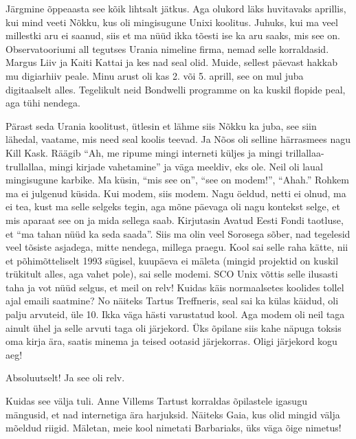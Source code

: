 Järgmine õppeaasta see kõik lihtsalt jätkus. Aga olukord läks huvitavaks aprillis, kui mind veeti Nõkku, kus oli mingisugune Unixi koolitus. Juhuks, kui ma veel millestki aru ei saanud, siis et ma nüüd ikka tõesti ise ka aru saaks, mis see on. Observatooriumi all tegutses Urania nimeline firma, nemad selle korraldasid. Margus Liiv ja  Kaiti Kattai ja kes nad seal olid. Muide, sellest päevast hakkab mu digiarhiiv peale.  Minu  arust oli kas 2. või 5. aprill, see on mul juba digitaalselt alles. Tegelikult neid Bondwelli programme on ka kuskil flopide peal, aga tühi nendega. 

Pärast seda Urania  koolitust,  ütlesin et lähme siis Nõkku ka juba, see siin lähedal, vaatame, mis need seal koolis teevad. Ja Nõos oli selline härrasmees nagu Kill Kask. Räägib \enquote{Ah, me ripume mingi interneti küljes ja mingi trillallaa-trullallaa, mingi kirjade vahetamine} ja väga meeldiv, eks ole. Neil oli laual mingisugune karbike. Ma küsin, \enquote{mis see on}, \enquote{see on modem!}, \enquote{Ahah.} Rohkem ma ei julgenud küsida. Kui modem, siis modem. Nagu öeldud, netti ei olnud, ma ei tea, kust ma selle selgeks tegin, aga mõne päevaga oli nagu kontekst selge, et mis aparaat see on ja mida sellega saab. Kirjutasin Avatud Eesti Fondi taotluse, et \enquote{ma tahan nüüd ka seda saada}. Siis ma olin veel Sorosega sõber, nad tegelesid veel tõsiste asjadega, mitte nendega, millega praegu. Kool sai selle raha kätte, nii et põhimõtteliselt 1993 sügisel, kuupäeva ei mäleta (mingid projektid on kuskil trükitult alles, aga vahet pole), sai selle modemi. SCO Unix võttis selle ilusasti taha ja vot nüüd selgus, et meil on relv! Kuidas käis normaalsetes koolides tollel ajal emaili saatmine? No näiteks Tartus Treffneris, seal sai ka külas käidud,  oli palju arvuteid, üle 10. Ikka väga hästi varustatud kool. Aga modem oli neil taga ainult ühel ja selle arvuti taga oli järjekord. Üks õpilane siis kahe näpuga toksis oma kirja ära, saatis minema ja teised ootasid järjekorras. Oligi järjekord kogu aeg! 


Absoluutselt! Ja see oli relv. 

Kuidas see välja tuli. Anne Villems Tartust korraldas õpilastele igasugu mängusid, et nad internetiga  ära harjuksid. Näiteks Gaia, kus olid mingid välja mõeldud riigid. Mäletan, meie kool nimetati Barbariaks, üks väga õige nimetus! 

